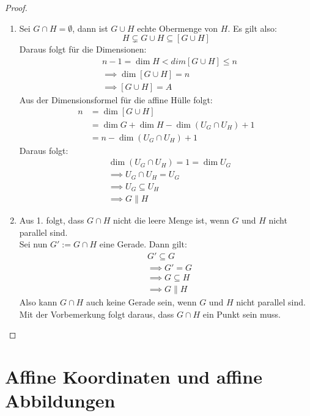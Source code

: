 \documentclass[parskip,a4paper,twoside,DIV15,BCOR12mm]{scrbook}
\begin{document}
\begin{comment}
$\dim{G\cap H}\le\dim{G}=1 \implies G\cap H=\begin{cases}
\emptyset\\
\text{Punkt}\\
\text{Gerade}
\end{cases}$
\end{comment}

\begin{proof}
\begin{enumerate}
\item Sei $G\cap H=\emptyset$, dann ist $G\cup H$ echte Obermenge von $H$. Es gilt also:
\[H \subsetneq G\cup H \subseteq [G\cup H]\]
Daraus folgt für die Dimensionen:
\begin{align*}
&n-1=\dim H < dim[G\cup H]\le n\\
&\implies \dim[G\cup H]=n\\
&\implies [G\cup H]=A
\end{align*}
Aus der Dimensionsformel für die affine Hülle folgt:
\begin{align*}
n&=\dim[G\cup H]\\
&= \dim G+\dim H -\dim(U_G\cap U_H)+1\\
&= n-\dim(U_G\cap U_H)+1
\end{align*}
Daraus folgt:
\begin{align*}
&\dim(U_G\cap U_H)=1=\dim U_G\\
&\implies U_G\cap U_H = U_G\\
&\implies U_G \subseteq U_H\\
&\implies G\parallel H
\end{align*}
\item Aus 1. folgt, dass $G\cap H$ nicht die leere Menge ist, wenn $G$ und $H$ nicht
parallel sind.\\
Sei nun $G':=G\cap H$ eine Gerade. Dann gilt:
\begin{align*}
&G'\subseteq G\\
&\implies G'=G\\
&\implies G\subseteq H\\
&\implies G\parallel H
\end{align*}
Also kann $G\cap H$ auch keine Gerade sein, wenn $G$ und $H$ nicht parallel sind. Mit der
Vorbemerkung folgt daraus, dass $G\cap H$ ein Punkt sein muss.
\end{enumerate}
\end{proof}

\chapter{Affine Koordinaten und affine Abbildungen}
\end{document}
